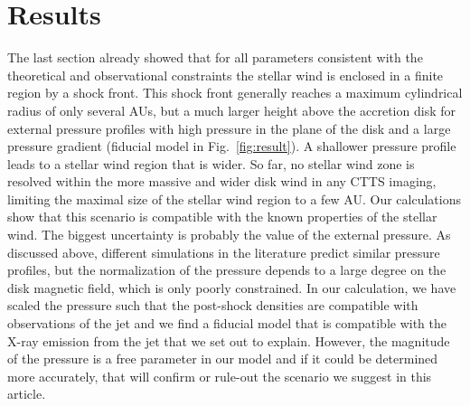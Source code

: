 \section{Results}
\label{sect:results}
The last section already showed that for all parameters consistent with the theoretical and observational constraints the stellar wind is enclosed in a finite region by a shock front. This shock front generally reaches a maximum cylindrical radius of only several AUs, but a much larger height above the accretion disk for external pressure profiles with high pressure in the plane of the disk and a large pressure gradient (fiducial model in Fig.~\ref{fig:result}). A shallower pressure profile leads to a stellar wind region that is wider. So far, no stellar wind zone is resolved within the more massive and wider disk wind in any CTTS imaging, limiting the maximal size of the stellar wind region to a few AU. Our calculations show that this scenario is compatible with the known properties of the stellar wind. The biggest uncertainty is probably the value of the external pressure. As discussed above, different simulations in the literature predict similar pressure profiles, but the normalization of the pressure depends to a large degree on the disk magnetic field, which is only poorly constrained. In our calculation, we have scaled the pressure such that the post-shock densities are compatible with observations of the jet and we find a fiducial model that is compatible with the X-ray emission from the jet that we set out to explain. However, the magnitude of the pressure is a free parameter in our model and if it could be determined more accurately, that will confirm or rule-out the scenario we suggest in this article.

